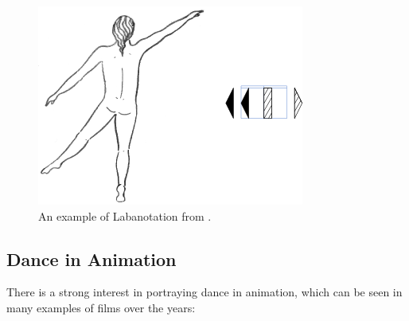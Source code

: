 \begin{figure}[!h]
\centering
\includegraphics[scale=0.5]{img/over-labanotation}
\caption{An example of Labanotation from \protect{}.}
\end{figure}

\subsection{Dance in Animation}
There is a strong interest in portraying dance in animation, which can be seen in many examples of films over the years:


